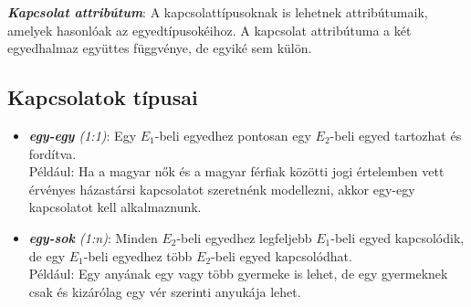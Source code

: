 \documentclass[tikz,12pt,margin=0px]{article}
\begin{document}
    \noindent \textbf{\emph{Kapcsolat attribútum}}: A kapcsolattípusoknak is lehetnek attribútumaik, amelyek hasonlóak az egyedtípusokéihoz. A kapcsolat attribútuma a két egyedhalmaz együttes függvénye, de egyiké sem külön.

	\subsection*{Kapcsolatok típusai}

	\begin{itemize}
        \item \emph{\textbf{egy-egy} (1:1)}: Egy $E_1$-beli egyedhez pontosan egy $E_2$-beli egyed tartozhat és fordítva.\\
        {\small Például: Ha a magyar nők és a magyar férfiak közötti jogi értelemben vett érvényes házastársi kapcsolatot szeretnénk modellezni, akkor egy-egy kapcsolatot kell alkalmaznunk.}
        \begin{center}
        \end{center}
        \item \emph{\textbf{egy-sok} (1:n)}: Minden $E_2$-beli egyedhez legfeljebb $E_1$-beli egyed kapcsolódik, de egy $E_1$-beli egyedhez több $E_2$-beli egyed kapcsolódhat.\\
        {\small Például: Egy anyának egy vagy több gyermeke is lehet, de egy gyermeknek csak és kizárólag egy vér szerinti anyukája lehet.}
        \begin{center}
        \end{center}


\end{itemize}
\end{document}
